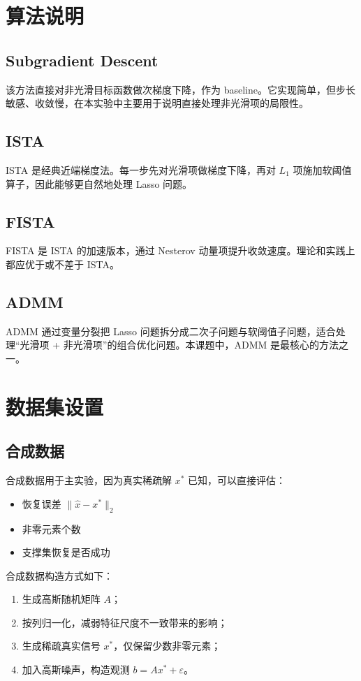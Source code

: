 \documentclass[12pt,a4paper]{ctexart}
\begin{document}
\section{算法说明}
\subsection{Subgradient Descent}
该方法直接对非光滑目标函数做次梯度下降，作为 baseline。它实现简单，但步长敏感、收敛慢，在本实验中主要用于说明直接处理非光滑项的局限性。

\subsection{ISTA}
ISTA 是经典近端梯度法。每一步先对光滑项做梯度下降，再对 $L_1$ 项施加软阈值算子，因此能够更自然地处理 Lasso 问题。

\subsection{FISTA}
FISTA 是 ISTA 的加速版本，通过 Nesterov 动量项提升收敛速度。理论和实践上都应优于或不差于 ISTA。

\subsection{ADMM}
ADMM 通过变量分裂把 Lasso 问题拆分成二次子问题与软阈值子问题，适合处理“光滑项 + 非光滑项”的组合优化问题。本课题中，ADMM 是最核心的方法之一。

\section{数据集设置}
\subsection{合成数据}
合成数据用于主实验，因为真实稀疏解 $x^\ast$ 已知，可以直接评估：
\begin{itemize}[leftmargin=2em]
    \item 恢复误差 $\|\hat{x} - x^\ast\|_2$
    \item 非零元素个数
    \item 支撑集恢复是否成功
\end{itemize}

合成数据构造方式如下：
\begin{enumerate}[label=\arabic*.]
    \item 生成高斯随机矩阵 $A$；
    \item 按列归一化，减弱特征尺度不一致带来的影响；
    \item 生成稀疏真实信号 $x^\ast$，仅保留少数非零元素；
    \item 加入高斯噪声，构造观测 $b = Ax^\ast + \varepsilon$。
\end{enumerate}
\end{document}
